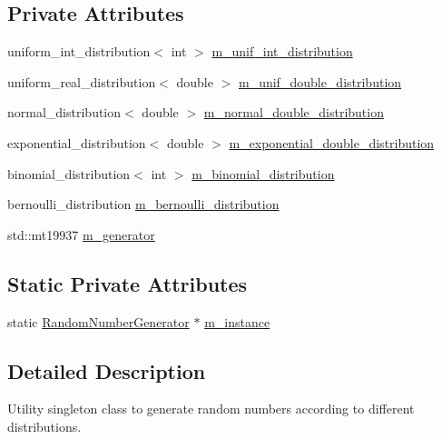 \subsection*{Private Attributes}
\begin{DoxyCompactItemize}
\item 
uniform\+\_\+int\+\_\+distribution$<$ int $>$ \mbox{\hyperlink{class_random_number_generator_a7a3a5b9bfbb1306f364704bc3a9860b6}{m\+\_\+unif\+\_\+int\+\_\+distribution}}
\item 
uniform\+\_\+real\+\_\+distribution$<$ double $>$ \mbox{\hyperlink{class_random_number_generator_ab7697a4a0f3efe902aa49828bd78f1e2}{m\+\_\+unif\+\_\+double\+\_\+distribution}}
\item 
normal\+\_\+distribution$<$ double $>$ \mbox{\hyperlink{class_random_number_generator_af52b8c4de45f210754524225e97279b1}{m\+\_\+normal\+\_\+double\+\_\+distribution}}
\item 
exponential\+\_\+distribution$<$ double $>$ \mbox{\hyperlink{class_random_number_generator_ac5c29b50fc9b914fffd34d5730a62ca7}{m\+\_\+exponential\+\_\+double\+\_\+distribution}}
\item 
binomial\+\_\+distribution$<$ int $>$ \mbox{\hyperlink{class_random_number_generator_a0669afa8b2ad0fd544f140e294ce581f}{m\+\_\+binomial\+\_\+distribution}}
\item 
bernoulli\+\_\+distribution \mbox{\hyperlink{class_random_number_generator_ae0cd7e84eca4dba3ba65902ffff61e96}{m\+\_\+bernoulli\+\_\+distribution}}
\item 
std\+::mt19937 \mbox{\hyperlink{class_random_number_generator_a2fd6f5958a3c4500beee344d6af66a39}{m\+\_\+generator}}
\end{DoxyCompactItemize}
\subsection*{Static Private Attributes}
\begin{DoxyCompactItemize}
\item 
static \mbox{\hyperlink{class_random_number_generator}{Random\+Number\+Generator}} $\ast$ \mbox{\hyperlink{class_random_number_generator_a4b1f72cf7dbba86ac83bff4f9f496de3}{m\+\_\+instance}}
\end{DoxyCompactItemize}


\subsection{Detailed Description}
Utility singleton class to generate random numbers according to different distributions. 


